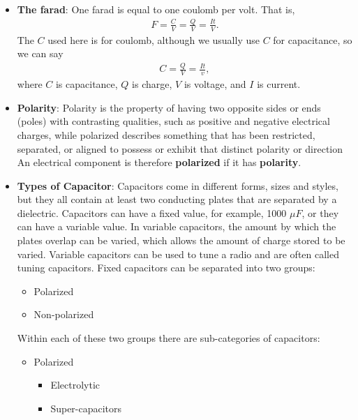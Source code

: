 \documentclass{report}
\begin{document}
\begin{itemize}
        \item \textbf{The farad}: One farad is equal to one coulomb per volt. That is,
            \begin{align*}
                F = \frac{C}{V} = \frac{Q}{V} = \frac{It}{V}
            .\end{align*}
            The $C$ used here is for coulomb, although we usually use $C$ for capacitance, so we can say
            \begin{align*}
                C = \frac{Q}{V} = \frac{It}{v} 
            ,\end{align*}
            where $C$ is capacitance, $Q$ is charge, $V$ is voltage, and $I$ is current.
        \item \textbf{Polarity}: Polarity is the property of having two opposite sides or ends (poles) with contrasting qualities, such as positive and negative electrical charges, while polarized describes something that has been restricted, separated, or aligned to possess or exhibit that distinct polarity or direction
            \bigbreak \noindent 
            An electrical component is therefore \textbf{polarized} if it has \textbf{polarity}.
        \item \textbf{Types of Capacitor}: Capacitors come in different forms, sizes and styles, but they all contain at least two conducting plates that are separated by a dielectric. Capacitors can have a fixed value, for example, 1000 $\mu F$, or they can have a variable value. In variable capacitors, the amount by which the plates overlap can be varied, which allows the amount of charge stored to be varied. Variable capacitors can be used to tune a radio and are often called tuning capacitors.
            \bigbreak \noindent 
            Fixed capacitors can be separated into two groups:
            \begin{itemize}
                \item Polarized
                \item Non-polarized
            \end{itemize}
            Within each of these two groups there are sub-categories of capacitors:
            \begin{itemize}
                \item Polarized
                \begin{itemize}
                    \item Electrolytic
                    \item Super-capacitors
                \end{itemize}

\end{itemize}
\end{itemize}
\end{document}
